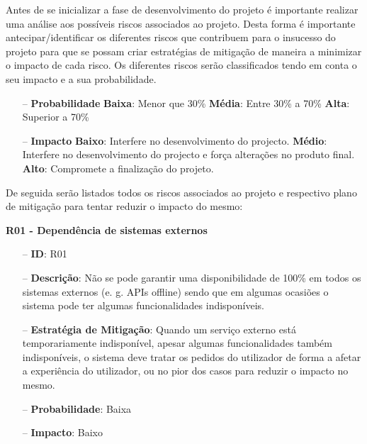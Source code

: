 Antes de se inicializar a fase de desenvolvimento do projeto é importante realizar uma análise aos possíveis riscos associados ao projeto. Desta forma é importante antecipar/identificar os diferentes riscos que contribuem para o insucesso do projeto para que se possam criar estratégias de mitigação de maneira a minimizar o impacto de cada risco. Os diferentes riscos serão classificados tendo em conta o seu impacto e a sua probabilidade.

\begin{itemize}
	\item[--] \textbf{Probabilidade}
		\subitem \textbf{Baixa}: Menor que 30\%
		\subitem \textbf{Média}: Entre 30\% a 70\%
		\subitem \textbf{Alta}: Superior a 70\%
	\item[--] \textbf{Impacto}
		\subitem \textbf{Baixo}: Interfere no desenvolvimento do projecto.
		\subitem \textbf{Médio}: Interfere no desenvolvimento do projecto e força alterações no produto final.
		\subitem \textbf{Alto}: Compromete a finalização do projeto.
\end{itemize}

De seguida serão listados todos os riscos associados ao projeto e respectivo plano de mitigação para tentar reduzir o impacto do mesmo:

\textbf{R01 - Dependência de sistemas externos}
\begin{itemize}
	\item[--] \textbf{ID}: R01
	\item[--] \textbf{Descrição}: Não se pode garantir uma disponibilidade de 100\% em todos os sistemas externos (e. g. APIs offline) sendo que em algumas ocasiões o sistema pode ter algumas funcionalidades indisponíveis.
	\item[--] \textbf{Estratégia de Mitigação}: Quando um serviço externo está temporariamente indisponível, apesar algumas funcionalidades também indisponíveis, o sistema deve tratar os pedidos do utilizador de forma a afetar a experiência do utilizador, ou no pior dos casos para reduzir o impacto no mesmo.
	\item[--] \textbf{Probabilidade}: Baixa
	\item[--] \textbf{Impacto}: Baixo
\end{itemize}

